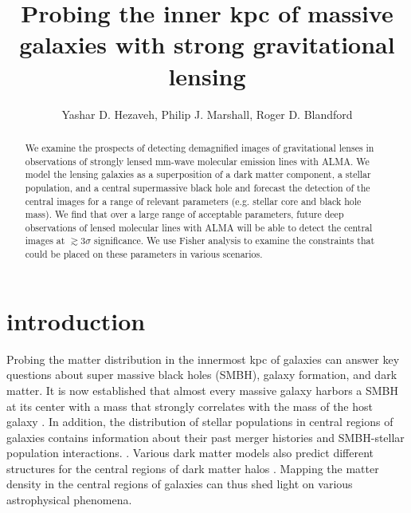 \documentclass[chicago]{emulateapj}
\begin{document}
\title{Probing the inner kpc of massive galaxies with strong gravitational lensing}
\author{Yashar D. Hezaveh, Philip J. Marshall, Roger D. Blandford}  

\begin{abstract}  
\noindent
We examine the prospects of detecting demagnified images of gravitational lenses in observations of strongly lensed mm-wave molecular emission lines with ALMA. We model the lensing galaxies as a superposition of a dark matter component, a stellar population, and a central supermassive black hole and forecast the detection of the central images for a range of relevant parameters (e.g. stellar core and black hole mass).
We find that over a large range of acceptable parameters, future deep observations of lensed molecular lines with ALMA will be able to detect the central images at $\gtrsim 3\sigma$ significance. We use Fisher analysis to examine the  constraints that could be placed on these parameters in various scenarios. 

\end{abstract}






\section{introduction}
Probing the matter distribution in the innermost kpc of galaxies can answer key questions about super massive black holes (SMBH), galaxy formation, and dark matter. It is now established that almost every massive galaxy harbors a SMBH at its center with a mass that strongly correlates with the mass of the host galaxy \citep{Kormendy:95,Ferrarese:00,Gebhardt:00,Tremaine:02,Kormendy:13}.
In addition, the distribution of stellar populations in central regions of galaxies contains information about their past merger histories and SMBH-stellar population interactions. \citep{}.  Various dark matter models also predict different structures for the central regions of dark matter halos \citep[e.g][]{Rocha:13}.  Mapping the matter density in the central regions of galaxies can thus shed light on various astrophysical phenomena.
\end{document}
